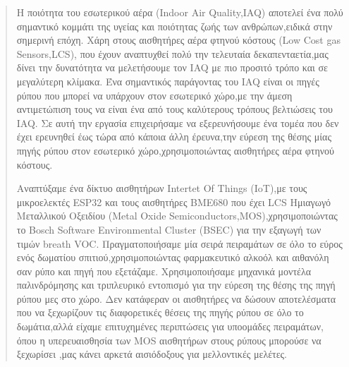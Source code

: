 

\begin{abstract}


Η ποιότητα του εσωτερικού αέρα (Indoor Air Quality,IAQ) αποτελεί ένα πολύ σημαντικό κομμάτι της υγείας και ποιότητας ζωής των ανθρώπων,ειδικά στην σημερινή επόχη.
Χάρη στους αισθητήρες αέρα φτηνού κόστους (Low Cost gas Sensors,LCS), που έχουν αναπτυχθεί πολύ την τελευταία δεκαπενταετία,μας δίνει την δυνατότητα να μελετήσουμε τον IAQ με πιο προσιτό τρόπο και σε μεγαλύτερη κλίμακα.
Ένα σημαντικός παράγοντας του IAQ είναι οι πηγές ρύπου που μπορεί να υπάρχουν στον εσωτερικό χώρο,με την άμεση αντιμετώπιση τους να είναι ένα από τους καλύτερους τρόπους βελτιώσεις του IAQ.
Σε αυτή την εργασία επιχειρήσαμε να εξερευνήσουμε ένα τομέα που δεν έχει ερευνηθεί έως τώρα από κάποια άλλη έρευνα,την εύρεση της θέσης μίας πηγής ρύπου στον εσωτερικό χώρο,χρησιμοποιώντας αισθητήρες αέρα φτηνού κόστους.

Αναπτύξαμε ένα δίκτυο αισθητήρων Intertet Of Things (IoT),με τους μικροελεκτές ESP32 και τους αισθητήρες BME680 που έχει LCS Ημιαγωγό Μεταλλικού Οξειδίου (Metal Oxide Semiconductors,MOS),χρησιμοποιώντας το  Bosch Software Environmental Cluster (BSEC) για την εξαγωγή των τιμών breath VOC.
Πραγματοποιήσαμε μία σειρά πειραμάτων σε όλο το εύρος ενός δωματίου σπιτιού,χρησιμοποιώντας φαρμακευτικό αλκοόλ και αιθανόλη σαν ρύπο και πηγή που εξετάζαμε.
Χρησιμοποιήσαμε μηχανικά μοντέλα παλινδρόμησης και τριπλευρικό εντοπισμό για την εύρεση της θέσης της πηγή ρύπου μες στο χώρο.
Δεν κατάφεραν οι αισθητήρες να δώσουν αποτελέσματα που να ξεχωρίζουν τις διαφορετικές θέσεις της πηγής ρύπου σε όλο το δωμάτια,αλλά είχαμε επιτυχημένες περιπτώσεις για υποομάδες πειραμάτων,
όπου η υπερευαισθησία των MOS αισθητήρων στους ρύπους μπορούσε να ξεχωρίσει ,μας κάνει αρκετά αισιόδοξους για μελλοντικές μελέτες.

\end{abstract}

